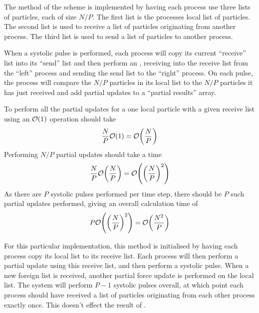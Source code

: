 The \pairoperation{} method of the \systolicloop{} scheme is
implemented by having each process use three lists of particles,
each of size $N/P$.
%
The first list is the processes local list of particles.
%
The second list is used to receive a list of particles originating from
another process.
%
The third list is used to send a list of particles to another process.

When a systolic pulse is performed,
each process will copy its current ``receive''
list into its ``send'' list and then perform an \mpisendrecv{}, receiving
into the receive list from the ``left'' process and sending the send list
to the ``right'' process.
%
On each pulse, the process will compare the $N/P$ particles in its
local list to the $N/P$ particles it has just received and
add partial updates to a ``partial results'' array.

%
To perform all the partial updates for a one local particle
with a given receive list using an $\mathcal{O}{\left({ 1 }\right)}$ operation should take
\begin{equation}
    \frac{N}{P}\mathcal{O}{\left({ 1 }\right)} = \mathcal{O}{\left({ \frac{N}{P} }\right)}
\end  {equation}
%
Performing $N/P$ partial updates should take a time
\begin{equation}
    \frac{N}{P}\mathcal{O}{\left({ \frac{N}{P} }\right)} = \mathcal{O}{\left({ \left( \frac{N}{P} \right)^2 }\right)}
\end  {equation}
%
As there are $P$ systolic pulses performed per time step,
there should be $P$ such partial updates
performed, giving an overall calculation time of
\begin{equation}
    \label{eqn:systolic_loop_pair_operation_overall_time}
    P\mathcal{O}{\left({  \left(\frac{N}{P}\right)^2  }\right)} = \mathcal{O}{\left({ \frac{N^2}{P} }\right)}
\end  {equation}


For this particular implementation,
this method is initialised by having each process
copy its local list to its receive list.
%
Each process will then perform a partial update using this receive
list, and then perform a systolic pulse.
%
When a new foreign list is received, another partial force update
is performed on the local list.
%
The system will perform $P-1$ systolic pulses overall, at which point
each process should have received a list of particles originating
from each other process exactly once.
%
This doesn't effect the result of
.


